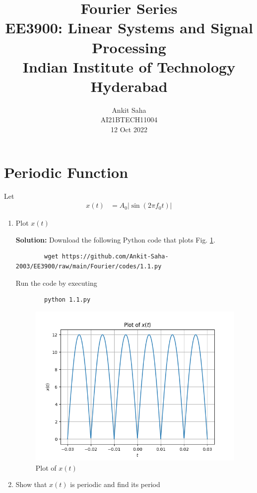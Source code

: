 \documentclass[journal,12pt,twocolumn]{IEEEtran}
\title{Fourier Series \\ \Large EE3900: Linear Systems and Signal Processing \\ \large Indian Institute of Technology Hyderabad}
\author{Ankit Saha \\ \normalsize AI21BTECH11004 \\ \vspace*{20pt} \normalsize 12 Oct 2022}
\newcommand{\solution}{\noindent \textbf{Solution: }}
\providecommand{\brak}[1]{\ensuremath{\left(#1\right)}}
\providecommand{\abs}[1]{\left\vert#1\right\vert}
\numberwithin{equation}{section}
\numberwithin{figure}{section}
\renewcommand\thesection{\arabic{section}}
\begin{document}
	\maketitle

	\section{Periodic Function}
	Let 
	\begin{align}
		x(t) &= A_0\abs{\sin\brak{2\pi f_0 t}}
		\label{eq:10-orig-diff-def}
	\end{align}

	\begin{enumerate}[label=\thesection.\arabic*,ref=\thesection.\theenumi]
	\item Plot $x(t)$
	
	\solution Download the following Python code that plots Fig. \ref{fig-1.1}.
	\begin{lstlisting}
		wget https://github.com/Ankit-Saha-2003/EE3900/raw/main/Fourier/codes/1.1.py
	\end{lstlisting}
	
	Run the code by executing
	\begin{lstlisting}
		python 1.1.py
	\end{lstlisting}

	\begin{figure}[!ht]
		\centering
		\includegraphics[width=\columnwidth]{./figs/1.1.png}
		\caption{Plot of $x(t)$}
		\label{fig-1.1}	
	\end{figure}
	
	\item Show that $x(t)$ is periodic and find its period
	

\end{enumerate}
\end{document}
